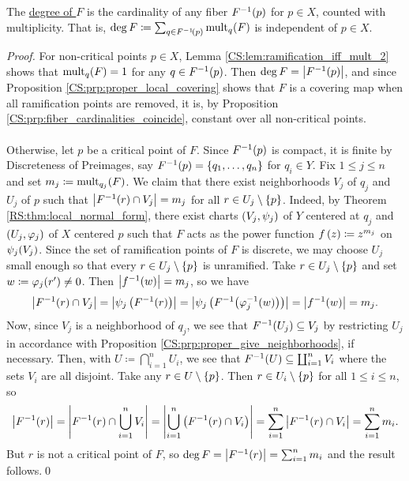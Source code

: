 \documentclass[../Moduli_Spaces_of_Riemann_Surfaces.tex]{subfiles}
\begin{document}
    \begin{defthm}\label{CS:thm:degree_sum_of_multiplicities}
        The \ul{degree of $F$} is the cardinality of any fiber $F^{-1}\!\left(p\right)$ for $p\in X$, counted with multiplicity. That is, $\deg F\coloneqq\sum_{q\in F^{-1}\!\left(p\right)}\operatorname{mult}_q\!\left(F\right)$ is independent of $p\in X$.
    \end{defthm}
    \begin{proof}
        For non-critical points $p\in X$, Lemma \ref{CS:lem:ramification_iff_mult_2} shows that $\operatorname{mult}_q\!\left(F\right)=1$ for any $q\in F^{-1}\!\left(p\right)$. Then $\deg F=\left|F^{-1}\!\left(p\right)\right|$, and since Proposition \ref{CS:prp:proper_local_covering} shows that $F$ is a covering map when all ramification points are removed, it is, by Proposition \ref{CS:prp:fiber_cardinalities_coincide}, constant over all non-critical points.\\\ \\
        Otherwise, let $p$ be a critical point of $F$. Since $F^{-1}\!\left(p\right)$ is compact, it is finite by Discreteness of Preimages, say $F^{-1}\!\left(p\right)=\left\{q_1,\dots,q_n\right\}$ for $q_i\in Y$. Fix $1\leq j\leq n$ and set $m_j\coloneqq\operatorname{mult}_{q_j}\!\left(F\right)$. We claim that there exist neighborhoods $V_j$ of $q_j$ and $U_j$ of $p$ such that $\left|F^{-1}\!\left(r\right)\cap V_j\right|=m_j$ for all $r\in U_j\setminus\left\{p\right\}$. Indeed, by Theorem \ref{RS:thm:local_normal_form}, there exist charts $\left(V_j,\psi_j\right)$ of $Y$ centered at $q_j$ and $\left(U_j,\varphi_j\right)$ of $X$ centered $p$ such that $F$ acts as the power function $f\left(z\right)\coloneqq z^{m_j}$ on $\psi_j\!\left(V_j\right)$. Since the set of ramification points of $F$ is discrete, we may choose $U_j$ small enough so that every $r\in U_j\setminus\left\{p\right\}$ is unramified. Take $r\in U_j\setminus\left\{p\right\}$ and set $w\coloneqq\varphi_j\!\left(r'\right)\neq0$. Then $\left|f^{-1}\!\left(w\right)\right|=m_j$, so we have
        \begin{equation*}
            \left|F^{-1}\!\left(r\right)\cap V_j\right|=\left|\psi_j\left(F^{-1}\!\left(r\right)\right)\right|=\left|\psi_j\left(F^{-1}\!\left(\varphi_j^{-1}\!\left(w\right)\right)\right)\right|=\left|f^{-1}\!\left(w\right)\right|=m_j.
        \end{equation*}
        Now, since $V_j$ is a neighborhood of $q_j$, we see that $F^{-1}\!\left(U_j\right)\subseteq V_j$ by restricting $U_j$ in accordance with Proposition \ref{CS:prp:proper_give_neighborhoods}, if necessary. Then, with $U\coloneqq\bigcap_{i=1}^{n}U_i$, we see that $F^{-1}\!\left(U\right)\subseteq\coprod_{i=1}^{n}V_i$ where the sets $V_i$ are all disjoint. Take any $r\in U\setminus\left\{p\right\}$. Then $r\in U_i\setminus\left\{p\right\}$ for all $1\leq i\leq n$, so
        \begin{equation*}
            \left|F^{-1}\!\left(r\right)\right|=\left|F^{-1}\!\left(r\right)\cap\bigcup_{i=1}^{n}V_i\right|=\left|\bigcup_{i=1}^{n}\left(F^{-1}\!\left(r\right)\cap V_i\right)\right|=\sum_{i=1}^{n}\left|F^{-1}\!\left(r\right)\cap V_i\right|=\sum_{i=1}^{n}m_i.
        \end{equation*}
        But $r$ is not a critical point of $F$, so $\deg F=\left|F^{-1}\!\left(r\right)\right|=\sum_{i=1}^{n}m_i$ and the result follows.\qed
    \end{proof}
\end{document}
